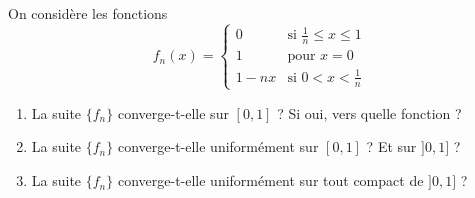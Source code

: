 

\begin{exercice}\label{exo112}

On considère les fonctions
\begin{equation}
	f_n(x)=
\begin{cases}
	0	&	\text{si $\frac{ 1 }{ n }\leq x\leq 1$}\\
	1	&	 \text{pour $x=0$}\\
	1-nx	&	 \text{si $0<x<\frac{ 1 }{ n }$}
\end{cases}
\end{equation}
\begin{enumerate}
\item La suite $\{f_n\}$ converge-t-elle sur $[0,1]$ ? Si oui, vers quelle fonction ?
\item La suite $\{ f_n \}$ converge-t-elle uniformément sur $[0,1]$ ? Et sur $]0,1]$ ?
\item La suite $\{ f_n \}$  converge-t-elle uniformément sur tout compact de $]0,1]$ ?
\end{enumerate}

\end{exercice}
